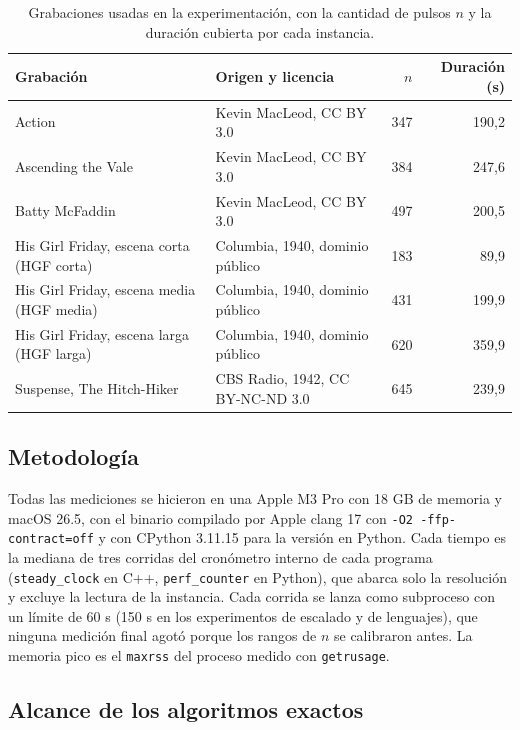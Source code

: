 \begin{table}[tbp]
\centering
\caption{Grabaciones usadas en la experimentación, con la cantidad de pulsos $n$ y la duración cubierta por cada instancia.}
\label{tab:grabaciones}
\footnotesize
\begin{tabular}{llrr}
\toprule
Grabación & Origen y licencia & $n$ & Duración (s) \\
\midrule
Action & Kevin MacLeod, CC BY 3.0 & 347 & 190,2 \\
Ascending the Vale & Kevin MacLeod, CC BY 3.0 & 384 & 247,6 \\
Batty McFaddin & Kevin MacLeod, CC BY 3.0 & 497 & 200,5 \\
His Girl Friday, escena corta (HGF corta) & Columbia, 1940, dominio público & 183 & 89,9 \\
His Girl Friday, escena media (HGF media) & Columbia, 1940, dominio público & 431 & 199,9 \\
His Girl Friday, escena larga (HGF larga) & Columbia, 1940, dominio público & 620 & 359,9 \\
Suspense, The Hitch-Hiker & CBS Radio, 1942, CC BY-NC-ND 3.0 & 645 & 239,9 \\
\bottomrule
\end{tabular}
\end{table}

\subsection{Metodología}
\label{sec:metodologia}

Todas las mediciones se hicieron en una Apple M3 Pro con 18 GB de memoria y macOS 26.5, con el binario compilado por Apple clang 17 con \texttt{-O2 -ffp-contract=off} y con CPython 3.11.15 para la versión en Python. Cada tiempo es la mediana de tres corridas del cronómetro interno de cada programa (\texttt{steady\_clock} en C++, \texttt{perf\_counter} en Python), que abarca solo la resolución y excluye la lectura de la instancia. Cada corrida se lanza como subproceso con un límite de 60 s (150 s en los experimentos de escalado y de lenguajes), que ninguna medición final agotó porque los rangos de $n$ se calibraron antes. La memoria pico es el \texttt{maxrss} del proceso medido con \texttt{getrusage}.

\subsection{Alcance de los algoritmos exactos}
\label{sec:e1}

